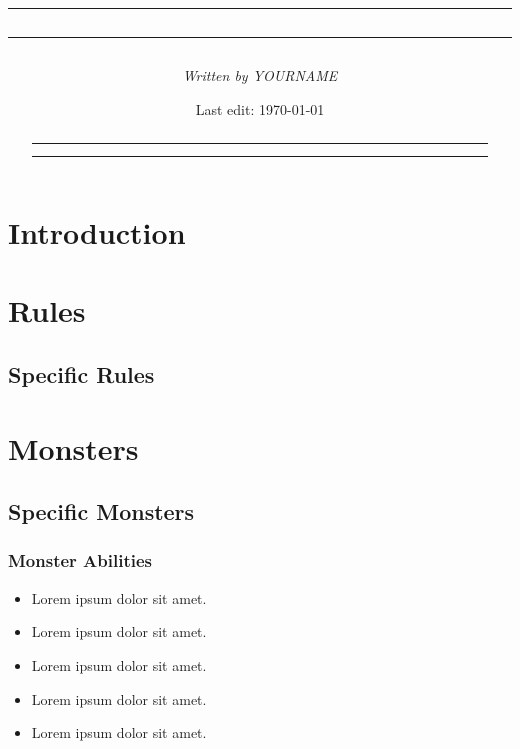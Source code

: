 \documentclass[a4paper,14pt,twoside]{extarticle}
\title{\vspace{-3cm} \hrule \vspace{2mm} \textbf{\textit{\zinetitle}} \vspace{2mm} \hrule}
\author{\textit{Written by YOURNAME}}
\date{Last edit: \today}
\newcommand{\colbox}[1]{ \noindent\colorbox{gray!25}{\parbox{0.93\linewidth}{#1}}\vspace{0.2cm}}
\begin{document}
\maketitle

\begin{abstract}
\hrule \vspace{2mm}
\begin{center}
    \lipsum[10]
\end{center}
\vspace{2mm} \hrule
\end{abstract}

\section{Introduction}
    \lipsum[2]

\begin{multicols*}{2}

\section{Rules}
    \lipsum[4]

\subsection*{Specific Rules}
    \lipsum[5]

\section{Monsters}
    \lipsum[6-8]

\subsection*{Specific Monsters}
\colbox{
    \lipsum[7]
}

\subsubsection*{Monster Abilities}

\begin{itemize}
    \item[\ding{228}] Lorem ipsum dolor sit amet.
    \item[\ding{228}] Lorem ipsum dolor sit amet.
    \item[\ding{228}] Lorem ipsum dolor sit amet.
    \item[\ding{228}] Lorem ipsum dolor sit amet.
    \item[\ding{228}] Lorem ipsum dolor sit amet.
\end{itemize}

\end{multicols*}
\end{document}
